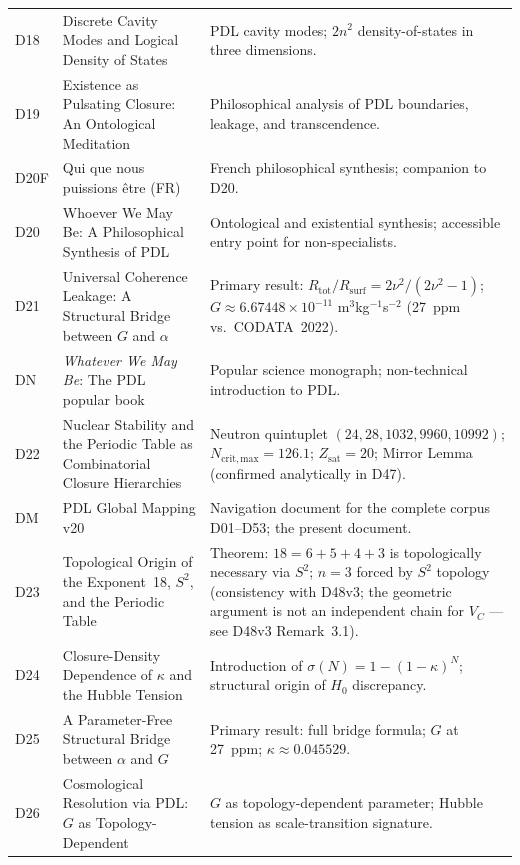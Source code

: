 \documentclass[11pt,a4paper]{article}
\theoremstyle{plain}
\theoremstyle{definition}
\theoremstyle{remark}
\begin{document}
\begin{longtable}{L{1.3cm}L{3.8cm}L{8.0cm}}
D18 & Discrete Cavity Modes and Logical Density of States~\cite{D18} & PDL cavity modes; $2n^2$ density-of-states in three dimensions.\\[0.3em]
D19 & Existence as Pulsating Closure: An Ontological Meditation~\cite{D19} & Philosophical analysis of PDL boundaries, leakage, and transcendence.\\[0.3em]
D20F & Qui que nous puissions \^etre (FR)~\cite{D20F} & French philosophical synthesis; companion to D20.\\[0.3em]
D20 & Whoever We May Be: A Philosophical Synthesis of PDL~\cite{D20} & Ontological and existential synthesis; accessible entry point for non-specialists.\\[0.3em]
D21 & Universal Coherence Leakage: A Structural Bridge between $G$ and $\alpha$~\cite{D21} & \textcolor{proofblue}{Primary result}: $R_{\mathrm{tot}}/R_{\mathrm{surf}} = 2\nu^2/(2\nu^2-1)$; $G \approx 6.67448\times 10^{-11}$ m$^3$kg$^{-1}$s$^{-2}$ (27~ppm vs.\ CODATA~2022).\\[0.3em]
DN & \emph{Whatever We May Be}: The PDL popular book~\cite{DN} & Popular science monograph; non-technical introduction to PDL.\\[0.3em]
D22 & Nuclear Stability and the Periodic Table as Combinatorial Closure Hierarchies~\cite{D22} & Neutron quintuplet $(24,28,1032,9960,10992)$; $N_{\mathrm{crit,max}}=126.1$; $Z_{\mathrm{sat}}=20$; Mirror Lemma (confirmed analytically in D47).\\[0.3em]
DM & PDL Global Mapping v20~\cite{DMapv10} & Navigation document for the complete corpus D01--D53; the present document.\\[0.3em]
D23 & Topological Origin of the Exponent~18, $S^2$, and the Periodic Table~\cite{D23} & \textcolor{proofblue}{Theorem}: $18=6+5+4+3$ is topologically necessary via $S^2$; $n=3$ forced by $S^2$ topology (consistency with D48v3; the geometric argument is not an independent chain for $V_C$ --- see D48v3 Remark~3.1).\\[0.3em]
D24 & Closure-Density Dependence of $\kappa$ and the Hubble Tension~\cite{D24} & Introduction of $\sigma(N)=1-(1-\kappa)^N$; structural origin of $H_0$ discrepancy.\\[0.3em]
D25 & A Parameter-Free Structural Bridge between $\alpha$ and $G$~\cite{D25} & \textcolor{proofblue}{Primary result}: full bridge formula; $G$ at 27~ppm; $\kappa\approx 0.045529$.\\[0.3em]
D26 & Cosmological Resolution via PDL: $G$ as Topology-Dependent~\cite{D26} & $G$ as topology-dependent parameter; Hubble tension as scale-transition signature.\\[0.3em]

\end{longtable}
\end{document}
